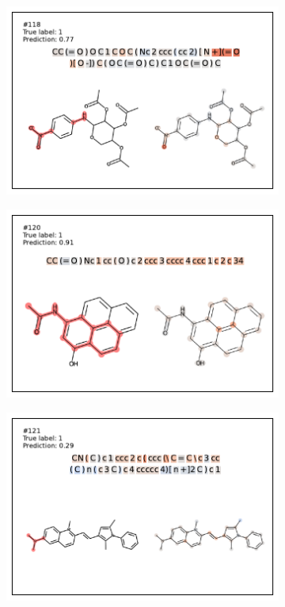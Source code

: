 \begin{figure}
\centering
\begin{subfigure}[b]{0.33\textwidth} 
  \centering 
  \includegraphics[width=\textwidth]{figures/ames/ames118.pdf} 
\end{subfigure}\begin{subfigure}[b]{0.33\textwidth} 
  \centering 
  \includegraphics[width=\textwidth]{figures/ames/ames120.pdf} 
\end{subfigure}\begin{subfigure}[b]{0.33\textwidth} 
  \centering 
  \includegraphics[width=\textwidth]{figures/ames/ames121.pdf} 

\end{subfigure}
\end{figure}

